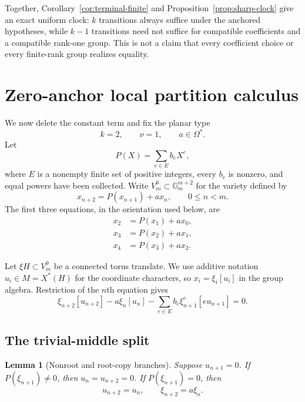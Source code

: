 \documentclass[11pt]{article}
\newtheorem{lemma}[theorem]{Lemma}
\theoremstyle{definition}
\theoremstyle{remark}
\newcommand{\Gm}{\mathbb{G}_{m}}
\newcommand{\Om}{\Omega}
\begin{document}
Together, Corollary~\ref{cor:terminal-finite} and Proposition~\ref{prop:sharp-clock} give an exact uniform clock: $k$ transitions always suffice under the anchored hypotheses, while $k-1$ transitions need not suffice for compatible coefficients and a compatible rank-one group.  This is not a claim that every coefficient choice or every finite-rank group realizes equality.

\section{Zero-anchor local partition calculus}
\label{sec:local}

We now delete the constant term and fix the planar type
\[
k=2,\qquad \nu=1,\qquad a\in\Om^*.
\]
Let
\begin{equation}
P(X)=\sum_{e\in E}b_eX^e,
\label{eq:zero-P}
\end{equation}
where $E$ is a nonempty finite set of positive integers, every $b_e$ is nonzero, and equal powers have been collected.  Write $V_m^0\subset\Gm^{m+2}$ for the variety defined by
\begin{equation}
x_{n+2}=P(x_{n+1})+a x_n,
\qquad 0\leq n<m.
\label{eq:zero-recurrence}
\end{equation}
The first three equations, in the orientation used below, are
\begin{equation}
\begin{aligned}
x_2&=P(x_1)+a x_0,\\
x_3&=P(x_2)+a x_1,\\
x_4&=P(x_3)+a x_2.
\end{aligned}
\label{eq:first-three}
\end{equation}

Let $\xi H\subset V_m^0$ be a connected torus translate.  We use additive notation $u_i\in M=X^*(H)$ for the coordinate characters, so $x_i=\xi_i[u_i]$ in the group algebra.  Restriction of the $n$th equation gives
\begin{equation}
\xi_{n+2}[u_{n+2}]-a\xi_n[u_n]
-\sum_{e\in E}b_e\xi_{n+1}^e[e u_{n+1}]=0.
\label{eq:zero-local-identity}
\end{equation}

\subsection{The trivial-middle split}

\begin{lemma}[Nonroot and root-copy branches]
\label{lem:A-branch}
Suppose $u_{n+1}=0$.  If $P(\xi_{n+1})\neq0$, then
$u_n=u_{n+2}=0$.  If $P(\xi_{n+1})=0$, then
\begin{equation}
u_{n+2}=u_n,
\qquad \xi_{n+2}=a\xi_n.
\label{eq:root-copy}
\end{equation}
\end{lemma}
\end{document}
